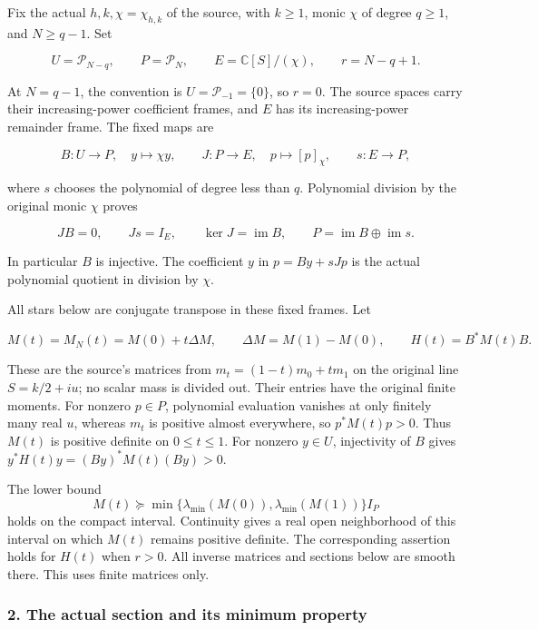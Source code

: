 Fix the actual \(h,k,\chi=\chi_{h,k}\) of the source, with \(k\ge1\), monic \(\chi\) of degree \(q\ge1\), and \(N\ge q-1\). Set

\[
U=\mathcal P_{N-q},\qquad P=\mathcal P_N,\qquad
E=\mathbb C[S]/(\chi),\qquad r=N-q+1.
\tag{AV1}
\]

At \(N=q-1\), the convention is \(U=\mathcal P_{-1}=\{0\}\), so \(r=0\). The source spaces carry their increasing-power coefficient frames, and \(E\) has its increasing-power remainder frame. The fixed maps are

\[
B:U\longrightarrow P,\quad y\longmapsto\chi y,\qquad
J:P\longrightarrow E,\quad p\longmapsto[p]_\chi,\qquad
s:E\longrightarrow P,
\tag{AV2}
\]

where \(s\) chooses the polynomial of degree less than \(q\). Polynomial division by the original monic \(\chi\) proves

\[
JB=0,\qquad Js=I_E,\qquad
\ker J=\operatorname{im}B,\qquad
P=\operatorname{im}B\oplus\operatorname{im}s.
\tag{AV3}
\]

In particular \(B\) is injective. The coefficient \(y\) in \(p=By+sJp\) is the actual polynomial quotient in division by \(\chi\).

All stars below are conjugate transpose in these fixed frames. Let

\[
M(t)=M_N(t)=M(0)+t\Delta M,\qquad
\Delta M=M(1)-M(0),\qquad H(t)=B^*M(t)B.
\tag{AV4}
\]

These are the source's matrices from \(m_t=(1-t)m_0+tm_1\) on the original line \(S=k/2+iu\); no scalar mass is divided out. Their entries have the original finite moments. For nonzero \(p\in P\), polynomial evaluation vanishes at only finitely many real \(u\), whereas \(m_t\) is positive almost everywhere, so \(p^*M(t)p>0\). Thus \(M(t)\) is positive definite on \(0\le t\le1\). For nonzero \(y\in U\), injectivity of \(B\) gives \(y^*H(t)y=(By)^*M(t)(By)>0\).

The lower bound \[
M(t)\succeq
\min\{\lambda_{\min}(M(0)),\lambda_{\min}(M(1))\}I_P
\] holds on the compact interval. Continuity gives a real open neighborhood of this interval on which \(M(t)\) remains positive definite. The corresponding assertion holds for \(H(t)\) when \(r>0\). All inverse matrices and sections below are smooth there. This uses finite matrices only.

\subsubsection{2. The actual section and its minimum property}\label{endpoint-variation_review--the-actual-section-and-its-minimum-property}

